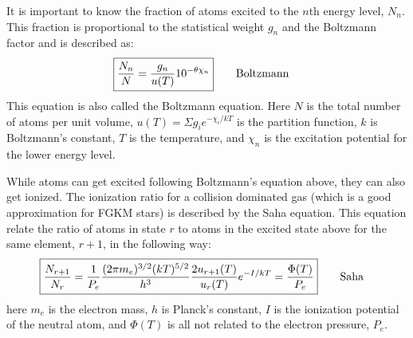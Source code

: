 It is important to know the fraction of atoms excited to the $n$th energy level, $N_n$. This
fraction is proportional to the statistical weight $g_n$ and the Boltzmann factor and is described
as:
\begin{align}
    \Aboxed{ \frac{N_n}{N} = \frac{g_n}{u(T)} 10^{-\theta\chi_n}} \tag*{Boltzmann}
\end{align}
This equation is also called the Boltzmann equation. Here $N$ is the total number of atoms per unit
volume, $u(T)=\Sigma g_i e^{-\chi_i/kT}$ is the partition function, $k$ is Boltzmann's constant, $T$
is the temperature, and $\chi_n$ is the excitation potential for the lower energy level.

While atoms can get excited following Boltzmann's equation above, they can also get ionized. The
ionization ratio for a collision dominated gas (which is a good approximation for FGKM stars) is
described by the Saha equation. This equation relate the ratio of atoms in state $r$ to atoms in the
excited state above for the same element, $r+1$, in the following way:
\begin{align}
  \Aboxed{ \frac{N_{r+1}}{N_r} = \frac{1}{P_e} \frac{(2\pi m_e)^{3/2}(kT)^{5/2}}{h^3} \frac{2u_{r+1}(T)}{u_r(T)} e^{-I/kT} = \frac{\Phi(T)}{P_e}} \tag*{Saha}
\end{align}
here $m_e$ is the electron mass, $h$ is Planck's constant, $I$ is the ionization potential of the
neutral atom, and $\Phi(T)$ is all not related to the electron pressure, $P_e$.

